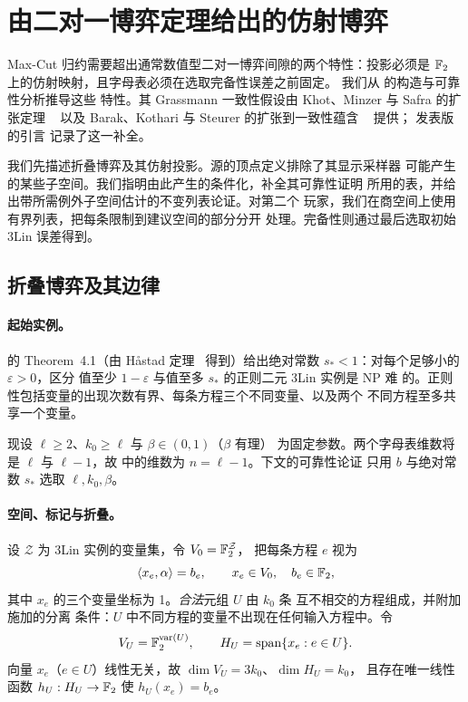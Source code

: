\section{由二对一博弈定理给出的仿射博弈}
\label{sec:affine-games}

Max-Cut 归约需要超出通常数值型二对一博弈间隙的两个特性：投影必须是
$\mathbb F_2$ 上的仿射映射，且字母表必须在选取完备性误差之前固定。
我们从 \cite[Sections~4--5]{DKKMS25} 的构造与可靠性分析推导这些
特性。其 Grassmann 一致性假设由 Khot、Minzer 与 Safra 的扩张定理
~\cite{KMS23} 以及 Barak、Kothari 与 Steurer 的扩张到一致性蕴含
~\cite[Theorems~9--11]{BKS19} 提供；\cite{DKKMS25} 发表版的引言
记录了这一补全。

我们先描述折叠博弈及其仿射投影。源的顶点定义排除了其显示采样器
可能产生的某些子空间。我们指明由此产生的条件化，补全其可靠性证明
所用的表，并给出带所需例外子空间估计的不变列表论证。对第二个
玩家，我们在商空间上使用有界列表，把每条限制到建议空间的部分分开
处理。完备性则通过最后选取初始 3Lin 误差得到。

\subsection{折叠博弈及其边律}

\paragraph{起始实例。}
\cite{DKKMS25} 的 Theorem~4.1（由 H\aa stad 定理~\cite{Hastad01}
得到）给出绝对常数 $s_*<1$：对每个足够小的 $\varepsilon>0$，区分
值至少 $1-\varepsilon$ 与值至多 $s_*$ 的正则二元 3Lin 实例是 NP 难
的。正则性包括变量的出现次数有界、每条方程三个不同变量、以及两个
不同方程至多共享一个变量。

现设 $\ell\ge2$、$k_0\ge\ell$ 与 $\beta\in(0,1)$（$\beta$ 有理）
为固定参数。两个字母表维数将是 $\ell$ 与 $\ell-1$，故
 中的维数为 $n=\ell-1$。下文的可靠性论证
只用 $b$ 与绝对常数 $s_*$ 选取 $\ell,k_0,\beta$。

\paragraph{空间、标记与折叠。}
设 $\mathcal Z$ 为 3Lin 实例的变量集，令 $V_0=\mathbb F_2^{\mathcal Z}$，
把每条方程 $e$ 视为
\[
  \langle x_e,\alpha\rangle=b_e,
  \qquad x_e\in V_0,\quad b_e\in\mathbb F_2,
\]
其中 $x_e$ 的三个变量坐标为 1。\emph{合法}元组 $U$ 由 $k_0$ 条
互不相交的方程组成，并附加 \cite[Section~4.2]{DKKMS25} 施加的分离
条件：$U$ 中不同方程的变量不出现在任何输入方程中。令
\[
  V_U=\mathbb F_2^{\operatorname{var}(U)},
  \qquad H_U=\operatorname{span}\{x_e:e\in U\}.
\]
向量 $x_e$（$e\in U$）线性无关，故 $\dim V_U=3k_0$、$\dim H_U=k_0$，
且存在唯一线性函数 $h_U:H_U\to\mathbb F_2$ 使 $h_U(x_e)=b_e$。

